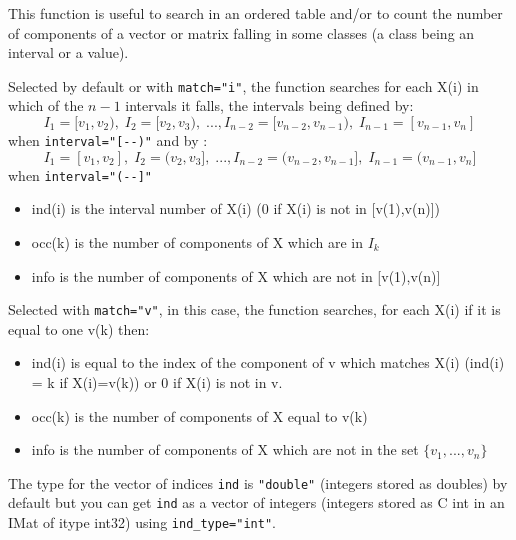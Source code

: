 \begin{mandescription}
This function is useful to search in an ordered table and/or to count the number of components
of a vector or matrix falling in some classes (a class being an interval or a value).

Selected by default or with  \verb+match="i"+, the function searches for each
X(i) in which of the $n-1$ intervals it falls, the intervals being defined by:
$$
   I_1 = [v_1, v_2), \;I_2 = [v_2, v_3),\;...,I_{n-2} = [v_{n-2},
   v_{n-1}),\; I_{n-1} = [v_{n-1}, v_n] 
$$
when \verb+interval="[--)"+ and by :
$$
   I_1 = [v_1, v_2], \;I_2 = (v_2, v_3],\;...,I_{n-2} = (v_{n-2},
   v_{n-1}],\; I_{n-1} = (v_{n-1}, v_n] 
$$
when \verb+interval="(--]"+
\begin{itemize}
   \item ind(i) is the interval number of X(i) (0 if X(i) is not in [v(1),v(n)])
   \item occ(k)  is the number of components of X which are in $I_k$
   \item info is the number of components of X which are not in [v(1),v(n)] 
\end{itemize}

Selected with  \verb+match="v"+, in this case, the function searches,
for each X(i) if it is equal to one v(k) then:
\begin{itemize}
   \item ind(i) is equal to the index of the component of v which matches X(i) 
                   (ind(i) = k if X(i)=v(k)) or 0 if X(i) is not in v.
   \item occ(k) is the number of components of X equal to v(k)
   \item info is the number of components of X which are not in the set $\{v_1,...,v_n\}$ 
\end{itemize}

The type for the vector of indices \verb+ind+ is \verb+"double"+ (integers stored as
doubles) by default but you can get \verb+ind+ as a vector of integers (integers stored as
C int in an IMat of itype int32) using \verb+ind_type="int"+.

\end{mandescription}

